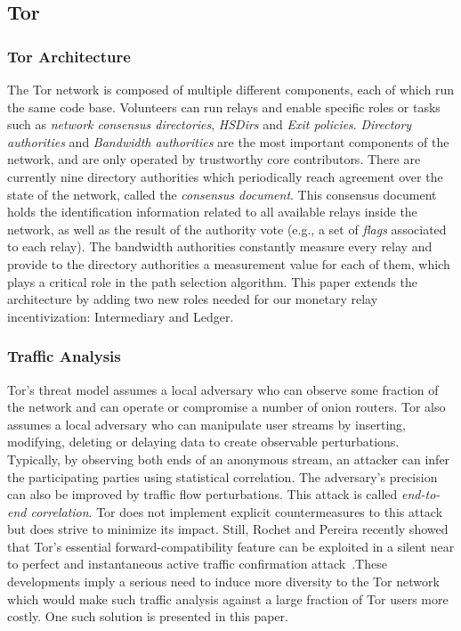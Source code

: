 \subsection{Tor}

\subsubsection{Tor Architecture}
The Tor network is composed of multiple different components, each of which run
the same code base. Volunteers can run relays and enable specific roles or tasks
such as \textit{network consensus directories}, \textit{HSDirs} and \textit{Exit
  policies}. \textit{Directory authorities} and \textit{Bandwidth authorities}
are the most important components of the network, and are only operated by
trustworthy core contributors. There are currently nine directory authorities
which periodically reach agreement over the state of the network, called the
\textit{consensus document}. This consensus document holds the identification
information related to all available relays inside the network, as well as the
result of the authority vote (e.g., a set of \textit{flags} associated to each
relay). The bandwidth authorities constantly measure every relay and provide to
the directory authorities a measurement value for each of them, which plays a
critical role in the path selection algorithm. This paper extends the
architecture by adding two new roles needed for our monetary relay
incentivization: Intermediary and Ledger.

\subsubsection{Traffic Analysis}
Tor's threat model assumes a local adversary who can observe some fraction of
the network and can operate or compromise a number of onion routers. Tor also
assumes a local adversary who can manipulate user streams by inserting,
modifying, deleting or delaying data to create observable
perturbations. Typically, by observing both ends of an anonymous stream, an
attacker can infer the participating parties using statistical correlation. The
adversary's precision can also be improved by traffic flow perturbations. This
attack is called \textit{end-to-end correlation}. Tor does not implement
explicit countermeasures to this attack but does strive to minimize its
impact. Still, Rochet and Pereira recently showed that Tor's essential
forward-compatibility feature can be exploited in a silent near to perfect and
instantaneous active traffic confirmation attack~\cite{rochet2018dropping}.These
developments imply a serious need to induce more diversity to the Tor network
which would make such traffic analysis against a large fraction of Tor users
more costly. One such solution is presented in this paper.

